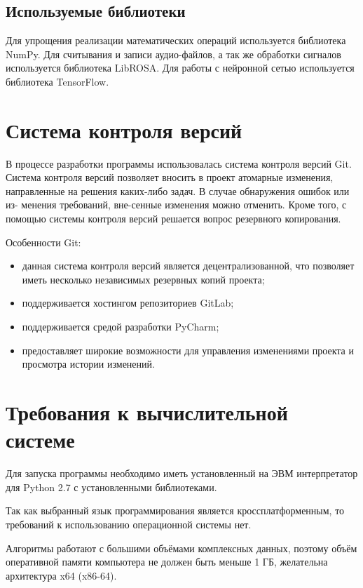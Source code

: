 \subsection{Используемые библиотеки}

Для упрощения реализации математических операций используется библиотека NumPy. Для считывания и записи аудио-файлов, а так же обработки сигналов используется библиотека LibROSA. Для работы с нейронной сетью используется библиотека TensorFlow.

\section{Система контроля версий}

В процессе разработки программы использовалась система контроля версий
Git. Система контроля версий позволяет вносить в проект атомарные изменения, направленные на решения каких-либо задач. В случае обнаружения ошибок или из- менения требований, вне-сенные изменения можно отменить. Кроме того, с помощью системы контроля версий решается вопрос резервного копирования.

Особенности Git:

\begin{itemize}
	\item данная система контроля версий является децентрализованной, что позволяет иметь несколько независимых резервных копий проекта;
	\item поддерживается хостингом репозиториев GitLab;
	\item поддерживается средой разработки PyCharm;
	\item предоставляет широкие возможности для управления изменениями проекта и просмотра истории изменений.
\end{itemize}

\section{Требования к вычислительной системе}

Для запуска программы необходимо иметь установленный на ЭВМ интерпретатор для Python 2.7 с установленными библиотеками. 

Так как выбранный язык программирования является кроссплатформенным, то требований к использованию операционной системы нет.

Алгоритмы работают с большими объёмами комплексных данных, поэтому объём оперативной памяти компьютера не должен быть меньше 1 ГБ, желательна архитектура x64 (x86-64).

